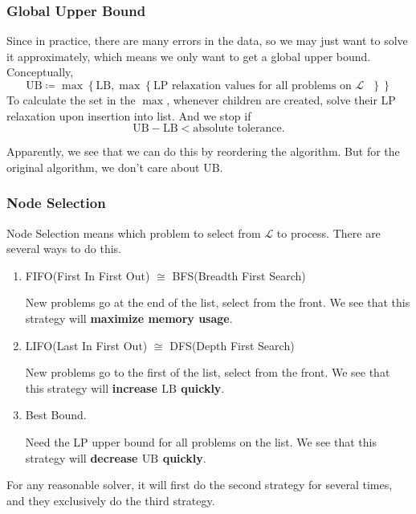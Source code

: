 \subsubsection{Global Upper Bound}
Since in practice, there are many errors in the data, so we may just want to solve it approximately, which means we only want to get a global upper bound.
Conceptually,
\[
	\mathrm{UB} \coloneqq \max\left\{\mathrm{LB}, \max\left\{\text{\(\mathrm{LP}\) relaxation values for all problems on \(\mathcal{L}\) }\right\}\right\}
\]
To calculate the set in the \(\max\), whenever children are created, solve their LP relaxation upon insertion into list. And we stop if
\[
	\mathrm{UB} - \mathrm{LB} < \text{absolute tolerance}.
\]

\begin{remark}
	Apparently, we see that we can do this by reordering the algorithm. But for the original algorithm, we don't care about \(\mathrm{UB}\).
\end{remark}

\subsubsection{Node Selection}
Node Selection means which problem to select from \(\mathcal{L} \) to process. There are several ways to do this.
\begin{enumerate}
	\item FIFO(First In First Out) \(\cong\) BFS(Breadth First Search)
	      \par New problems go at the end of the list, select from the front. We see that this strategy will \textbf{maximize memory usage}.
	\item LIFO(Last In First Out) \(\cong\) DFS(Depth First Search)
	      \par New problems go to the first of the list, select from the front. We see that this strategy will \textbf{increase \(\mathrm{LB}\) quickly}.
	\item Best Bound.
	      \par Need the LP upper bound for all problems on the list. We see that this strategy will \textbf{decrease \(\mathrm{UB}\) quickly}.
\end{enumerate}

\begin{remark}
	For any reasonable solver, it will first do the second strategy for several times, and they exclusively do the third strategy.
\end{remark}

